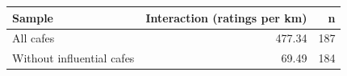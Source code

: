\begingroup\footnotesize
\begin{tabular}{lrr}
  \toprule
Sample & Interaction (ratings per km) & n \\ 
  \midrule
All cafes & 477.34 & 187 \\ 
  Without influential cafes & 69.49 & 184 \\ 
   \bottomrule
\end{tabular}
\endgroup
